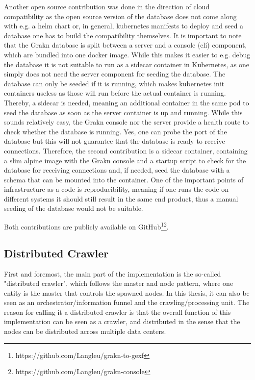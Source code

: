 Another open source contribution was done in the direction of cloud compatibility as the open source version of the database does not come along with e.g. a helm chart or, in general, kubernetes manifests to deploy and seed a database one has to build the compatibility themselves. It is important to note that the Grakn database is split between a server and a console (cli) component, which are bundled into one docker image. While this makes it easier to e.g. debug the database it is not suitable to run as a sidecar container in Kubernetes, as one simply does not need the server component for seeding the database. The database can only be seeded if it is running, which makes kubernetes init containers useless as those will run before the actual container is running. Thereby, a sidecar is needed, meaning an additional container in the same pod to seed the database as soon as the server container is up and running. While this sounds relatively easy, the Grakn console nor the server provide a health route to check whether the database is running. Yes, one can probe the port of the database but this will not guarantee that the database is ready to receive connections. Therefore, the second contribution is a sidecar container, containing a slim alpine image with the Grakn console and a startup script to check for the database for receiving connections and, if needed, seed the database with a schema that can be mounted into the container.
One of the important points of infrastructure as a code is reproducibility, meaning if one runs the code on different systems it should still result in the same end product, thus a manual seeding of the database would not be suitable.

Both contributions are publicly available on GitHub\footnote{https://github.com/Langleu/grakn-to-gexf}\footnote{https://github.com/Langleu/grakn-console}.

\subsection{Distributed Crawler}
\label{sec:crawler}
First and foremost, the main part of the implementation is the so-called "distributed crawler", which follows the master and node pattern, where one entity is the master that controls the spawned nodes. In this thesis, it can also be seen as an orchestrator/information funnel and the crawling/processing unit. The reason for calling it a distributed crawler is that the overall function of this implementation can be seen as a crawler, and distributed in the sense that the nodes can be distributed across multiple data centers.

